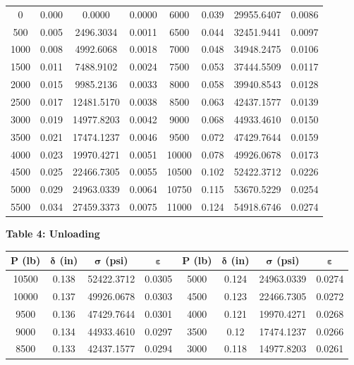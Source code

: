 \documentclass{article}
\begin{document}
\begin{center}
\begin{tabular}{|c c c c||c c c c|}
        0 & 0.000 & 0.0000 & 0.0000 & 6000 & 0.039 & 29955.6407 & 0.0086\\ 
        500 & 0.005 & 2496.3034 & 0.0011 & 6500 & 0.044 & 32451.9441 & 0.0097\\ 
        1000 & 0.008 & 4992.6068 & 0.0018 & 7000 & 0.048 & 34948.2475 & 0.0106\\ 
        1500 & 0.011 & 7488.9102 & 0.0024 & 7500 & 0.053 & 37444.5509 & 0.0117\\ 
        2000 & 0.015 & 9985.2136 & 0.0033 & 8000 & 0.058 & 39940.8543 & 0.0128\\ 
        2500 & 0.017 & 12481.5170 & 0.0038 & 8500 & 0.063 & 42437.1577 & 0.0139\\ 
        3000 & 0.019 & 14977.8203 & 0.0042 & 9000 & 0.068 & 44933.4610 & 0.0150\\ 
        3500 & 0.021 & 17474.1237 & 0.0046 & 9500 & 0.072 & 47429.7644 & 0.0159\\ 
        4000 & 0.023 & 19970.4271 & 0.0051 & 10000 & 0.078 & 49926.0678 & 0.0173\\ 
        4500 & 0.025 & 22466.7305 & 0.0055 & 10500 & 0.102 & 52422.3712 & 0.0226\\ 
        5000 & 0.029 & 24963.0339 & 0.0064 & 10750 & 0.115 & 53670.5229 & 0.0254\\ 
        5500 & 0.034 & 27459.3373 & 0.0075 & 11000 & 0.124 & 54918.6746 & 0.0274\\ \hline
    \end{tabular}
    \newpage
    {\large{\bf Table 4: Unloading\\}}
    \vspace{3mm}
    \begin{tabular}{|c c c c||c c c c|}
        \hline
        \textbf{P (lb)} & \(\bm{\delta}\)\textbf{ (in)} & \(\bm{\sigma}\)\textbf{ (psi)} & \(\bm{\varepsilon}\) & \textbf{P (lb)} & \(\bm{\delta}\)\textbf{ (in)} & \(\bm{\sigma}\)\textbf{ (psi)} & \(\bm{\varepsilon}\) \\ \hline
        10500 & 0.138 & 52422.3712 & 0.0305 & 5000 & 0.124 & 24963.0339 & 0.0274 \\
        10000 & 0.137 & 49926.0678 & 0.0303 & 4500 & 0.123 & 22466.7305 & 0.0272 \\ 
        9500 & 0.136 & 47429.7644 & 0.0301 &4000 & 0.121 & 19970.4271 & 0.0268 \\ 
        9000 & 0.134 & 44933.4610 & 0.0297 &3500 & 0.12 & 17474.1237 & 0.0266 \\ 
        8500 & 0.133 & 42437.1577 & 0.0294 &3000 & 0.118 & 14977.8203 & 0.0261 \\ 

\end{tabular}
\end{center}
\end{document}
